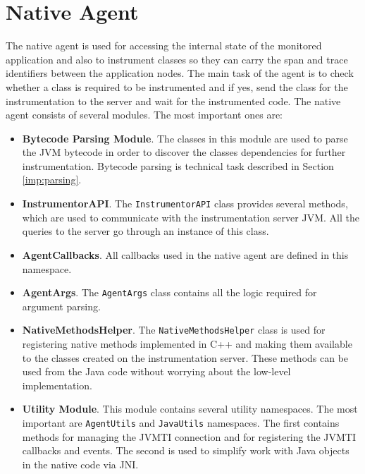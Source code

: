 \section{Native Agent}
\label{native_agent_design}
The native agent is used for accessing the internal state of the monitored application and also to instrument classes so they can carry the span and trace identifiers between the application nodes. The main task of the agent is to check whether a class is required to be instrumented and if yes, send the class for the instrumentation to the server and wait for the instrumented code. The native agent consists of several modules. The most important ones are:
\begin{itemize}
	\item \textbf{Bytecode Parsing Module}. \newline The classes in this module are used to parse the JVM bytecode in order to discover the classes dependencies for further instrumentation. Bytecode parsing is technical task described in Section \ref{imp:parsing}.
	\item \textbf{InstrumentorAPI}. \newline The \texttt{InstrumentorAPI} class provides several methods, which are used to communicate with the instrumentation server JVM. All the queries to the server go through an instance of this class.
	\item \textbf{AgentCallbacks}. \newline All callbacks used in the native agent are defined in this namespace.
	\item \textbf{AgentArgs}.  \newline The \texttt{AgentArgs} class contains all the logic required for argument parsing.
	\item \textbf{NativeMethodsHelper}. \newline The \texttt{NativeMethodsHelper} class is used for registering native methods implemented in C++ and making them available to the classes created on the instrumentation server. These methods can be used from the Java code without worrying about the low-level implementation.
	\item \textbf{Utility Module}. \newline This module contains several utility namespaces. The most important are \texttt{AgentUtils} and \texttt{JavaUtils} namespaces. The first contains methods for managing the JVMTI connection and for registering the JVMTI callbacks and events. The second is used to simplify work with Java objects in the native code via JNI.
\end{itemize}

